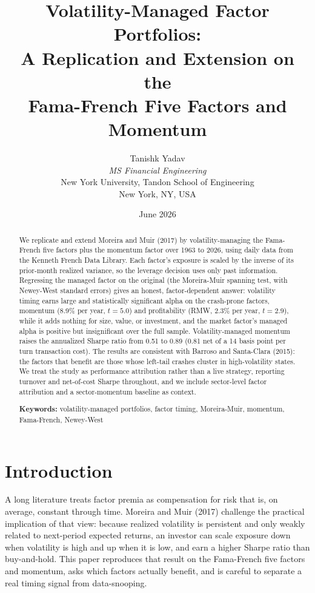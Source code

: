 \documentclass[11pt]{article}
\title{\textbf{Volatility-Managed Factor Portfolios:\\A Replication and Extension on the\\Fama-French Five Factors and Momentum}}
\author{Tanishk Yadav\\[2pt]\textit{MS Financial Engineering}\\New York University, Tandon School of Engineering\\New York, NY, USA}
\date{June 2026}
\begin{document}
\maketitle
\thispagestyle{fancy}

\begin{abstract}
\noindent
We replicate and extend Moreira and Muir (2017) by volatility-managing the Fama-French five factors plus the momentum factor over 1963 to 2026, using daily data from the Kenneth French Data Library. Each factor's exposure is scaled by the inverse of its prior-month realized variance, so the leverage decision uses only past information. Regressing the managed factor on the original (the Moreira-Muir spanning test, with Newey-West standard errors) gives an honest, factor-dependent answer: volatility timing earns large and statistically significant alpha on the crash-prone factors, momentum (8.9\% per year, $t=5.0$) and profitability (RMW, 2.3\% per year, $t=2.9$), while it adds nothing for size, value, or investment, and the market factor's managed alpha is positive but insignificant over the full sample. Volatility-managed momentum raises the annualized Sharpe ratio from 0.51 to 0.89 (0.81 net of a 14 basis point per turn transaction cost). The results are consistent with Barroso and Santa-Clara (2015): the factors that benefit are those whose left-tail crashes cluster in high-volatility states. We treat the study as performance attribution rather than a live strategy, reporting turnover and net-of-cost Sharpe throughout, and we include sector-level factor attribution and a sector-momentum baseline as context.

\medskip
\noindent\textbf{Keywords:} volatility-managed portfolios, factor timing, Moreira-Muir, momentum, Fama-French, Newey-West
\end{abstract}

\section{Introduction}

A long literature treats factor premia as compensation for risk that is, on average, constant through time. Moreira and Muir (2017) challenge the practical implication of that view: because realized volatility is persistent and only weakly related to next-period expected returns, an investor can scale exposure down when volatility is high and up when it is low, and earn a higher Sharpe ratio than buy-and-hold. This paper reproduces that result on the Fama-French five factors and momentum, asks which factors actually benefit, and is careful to separate a real timing signal from data-snooping.
\end{document}
